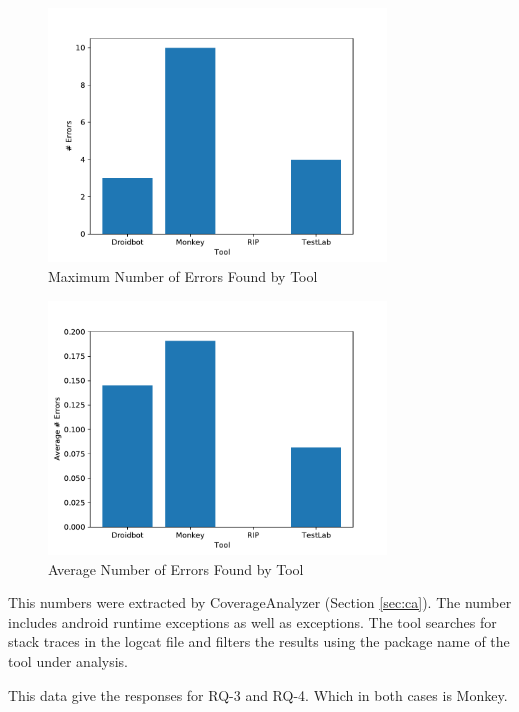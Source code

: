 \begin{figure}[h]
\centering
\includegraphics[width=0.8\textwidth]{../Figures/maxErrors.pdf}
\caption{Maximum Number of Errors Found by Tool}\label{fig:maxerrors}
\end{figure}

\begin{figure}[h]
\centering
\includegraphics[width=0.8\textwidth]{../Figures/averageErrors.pdf}
\caption{Average Number of Errors Found by Tool}\label{fig:averagaerrors}
\end{figure}

This numbers were extracted by CoverageAnalyzer (Section \ref{sec:ca}). The number includes android runtime exceptions as well as exceptions. The tool searches for stack traces in the logcat file and filters the results using the package name of the tool under analysis. 

This data give the responses for RQ-3 and RQ-4. Which in both cases is Monkey.

